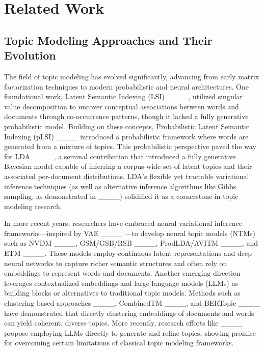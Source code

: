 \section{Related Work}
\subsection{Topic Modeling Approaches and Their Evolution} %
The field of topic modeling has evolved significantly, advancing from early matrix factorization techniques to modern probabilistic and neural architectures. One foundational work, Latent Semantic Indexing (LSI) ____,
utilized singular value decomposition to uncover conceptual associations between words and documents through co-occurrence patterns, though it lacked a fully generative probabilistic model.
Building on these concepts, Probabilistic Latent Semantic Indexing (pLSI) ____
introduced a probabilistic framework where words are generated from a mixture of topics. This probabilistic perspective paved the way for LDA ____, 
a seminal contribution that introduced a fully generative Bayesian model capable of inferring a corpus-wide set of latent topics and their associated per-document distributions. LDA’s flexible yet tractable variational inference techniques (as well as alternative inference algorithms like Gibbs sampling, as demonstrated in ____)
solidified it as a cornerstone in topic modeling research.


In more recent years, researchers have embraced neural variational inference frameworks—inspired by VAE ____
—to develop neural topic models (NTMs) such as 
NVDM ____, 
GSM/GSB/RSB
____, 
ProdLDA/AVITM ____, 
and ETM ____. 
These models employ continuous latent representations and deep neural networks to capture richer semantic structures and often rely on embeddings to represent words and documents. 
Another emerging direction leverages contextualized embeddings and large language models (LLMs) as building blocks or alternatives to traditional topic models. Methods such as clustering-based approaches ____,
CombinedTM ____, and 
BERTopic ____
have demonstrated that directly clustering embeddings of documents and words can yield coherent, diverse topics. More recently, research efforts like
____ propose employing LLMs directly to generate and refine topics, showing promise for overcoming certain limitations of classical topic modeling frameworks.
